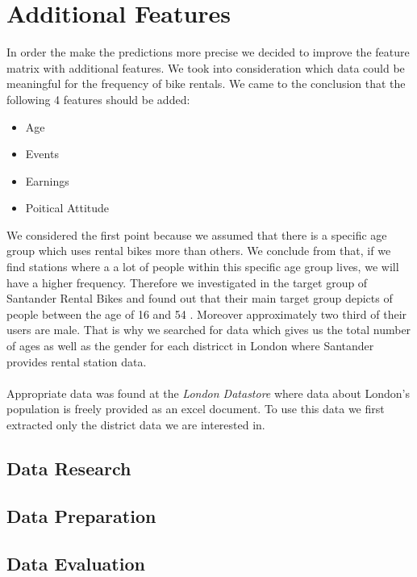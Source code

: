 
\section{Additional Features}
In order the make the predictions more precise we decided to improve the feature matrix with additional features.
We took into consideration which data could be meaningful for the frequency of bike rentals. 
We came to the conclusion that the following 4 features should be added:
\begin{itemize}
\item Age
\item Events
\item Earnings
\item Poitical Attitude
\end{itemize}
We considered the first point because we assumed that there is a specific age group which uses rental bikes more than others. We conclude from that, if we find stations where a a lot of people within this specific age group lives, we will have a higher frequency. Therefore we investigated in the target group of Santander Rental Bikes and found out that their main target group depicts of people between the age of 16 and 54 \cite{Santander}. Moreover approximately two third of their users are male. That is why we searched for data which gives us the total number of ages as well as the gender for each districct in London where Santander provides rental station data. \\\\
Appropriate data was found at the \emph{London Datastore} where data about London's population is freely provided as an excel document. To use this data we first extracted only the district data we are interested in.  
\subsection{Data Research}

\subsection{Data Preparation}

\subsection{Data Evaluation}
